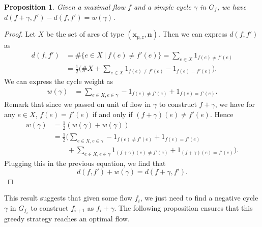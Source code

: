 \documentclass[]{article}
\newtheorem{proposition}{Proposition}
\begin{document}
\begin{proposition}
	Given a maximal flow $f$ and a simple cycle $\gamma$ in $G_f$, we have $d(f+\gamma, f') - d(f,f') = w(\gamma)$.
\end{proposition}
\begin{proof}
	Let $X$ be the set of arcs of type $(\mathbf{x}_{p,z},\mathbf{n})$. Then we can express $d(f,f')$ as
	\begin{align*}
		d(f,f') & = \#\{e\in X ~|~ f(e)\neq f'(e)\}
		= \sum_{e\in X} 1_{f(e)\neq f'(e)} \\
		& = \frac{1}{2}\big( \#X + \sum_{e\in X} 1_{f(e)\neq f'(e)} - 1_{f(e)= f'(e)} \big).
	\end{align*}
	We can express the cycle weight as
	\begin{align*}
		w(\gamma) &  = \sum_{e\in X, e\in \gamma} - 1_{f(e)\neq f'(e)} + 1_{f(e)= f'(e)}.
	\end{align*}
	Remark that since we passed on unit of flow in $\gamma$ to construct $f+\gamma$, we have for any $e\in X$, $f(e)=f'(e)$ if and only if $(f+\gamma)(e) \neq f'(e)$.
	Hence
	\begin{align*}
		w(\gamma) &  = \frac{1}{2}(w(\gamma) + w(\gamma)) \\
		&= \frac{1}{2} \Big( 
		\sum_{e\in X, e\in \gamma} - 1_{f(e)\neq f'(e)} +  1_{f(e)= f'(e)} \\
		& \qquad +
		\sum_{e\in X, e\in \gamma} 1_{(f+\gamma)(e)\neq f'(e)} +  1_{(f+\gamma)(e)= f'(e)}
		\Big).
	\end{align*}
	Plugging this in the previous equation, we find that 
	$$d(f,f')+w(\gamma) = d(f+\gamma, f').$$
\end{proof}

This result suggests that given some flow $f_i$, we just need to find a negative cycle $\gamma$ in $G_{f_i}$ to construct $f_{i+1}$ as $f_i+\gamma$. The following proposition ensures that this greedy strategy reaches an optimal flow. 
\end{document}
